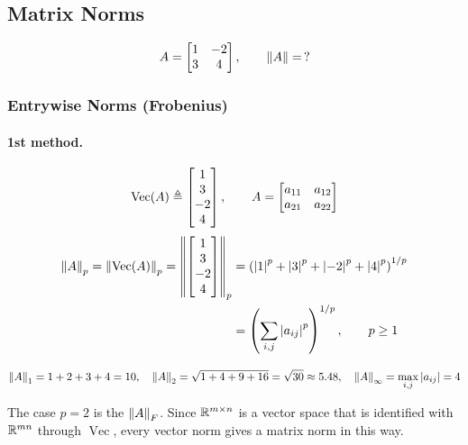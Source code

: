 \subsection{Matrix Norms}\label{ss:matrix-norms}
\[ A = \begin{bmatrix}1&-2\\3&4\end{bmatrix}, \qquad \left\lVert A \right\rVert=\,? \]

\subsubsection{Entrywise Norms (Frobenius)}
\paragraph{1st method.}
\[
\operatorname{Vec}(A) \triangleq \begin{bmatrix}1\\3\\-2\\4\end{bmatrix}, \qquad A = \begin{bmatrix}a_{11}&a_{12}\\a_{21}&a_{22}\end{bmatrix}
\]
\begin{align*}
\left\lVert A \right\rVert_p = \left\lVert \operatorname{Vec}(A) \right\rVert_p = \left\lVert \begin{bmatrix}1\\3\\-2\\4\end{bmatrix} \right\rVert_p &= \left(\left\lvert 1 \right\rvert^p+\left\lvert 3 \right\rvert^p+\left\lvert -2 \right\rvert^p+\left\lvert 4 \right\rvert^p\right)^{1/p}\\
&= \left(\sum_{i,j}\left\lvert a_{ij} \right\rvert^p\right)^{1/p}, \qquad p\ge1
\end{align*}
\begin{insight}
{\centering $\displaystyle
\left\lVert A \right\rVert_1 = 1+2+3+4 = 10, \quad
\left\lVert A \right\rVert_2 = \sqrt{1+4+9+16}=\sqrt{30}\approx5.48, \quad
\left\lVert A \right\rVert_\infty = \max_{i,j}\left\lvert a_{ij} \right\rvert = 4
$\par}
The case $p=2$ is the  $\left\lVert A \right\rVert_F$. Since $\mathbb{R}^{m\times n}$ is a vector space that is identified with $\mathbb{R}^{mn}$ through $\operatorname{Vec}$, every vector norm gives a matrix norm in this way.
\end{insight}

